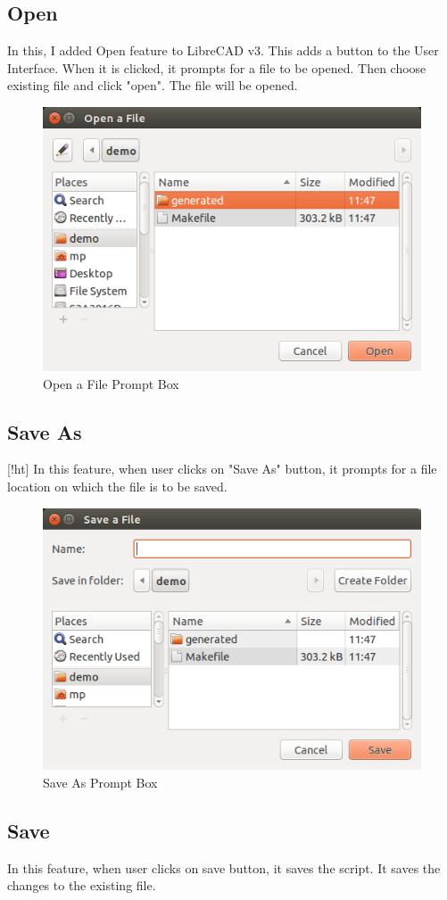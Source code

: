 \subsection{Open}
In this, I added Open feature to LibreCAD v3. This adds a button to the User Interface. When it is clicked, it prompts for a file to be opened. Then choose existing file and click "open". The file will be opened.\\
\begin{figure}[!ht]
\centering
\includegraphics[scale=0.5]{images/open.png}
\vspace{-1em}
\caption{Open a File Prompt Box}
\hspace{-1.5em}
\end{figure}
\subsection{Save As}[!ht]
In this feature, when user clicks on "Save As" button, it prompts for a file location on which the file is to be saved.
\begin{figure}[!ht]
\centering
\includegraphics[scale=0.5]{images/save.png}
\vspace{-1em}
\caption{Save As Prompt Box}
\hspace{-1.5em}
\end{figure}
\subsection{Save}
In this feature, when user clicks on save button, it saves the script. It saves the changes to the existing file. 
 